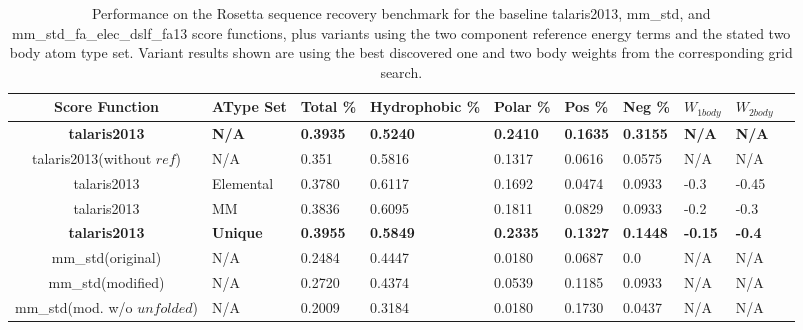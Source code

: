 \begin{table}[!htbp]

\fontsize{9pt}{9pt}
\selectfont

\begin{tabular}{c|lllllllll}
Score Function & AType Set & Total \% & Hydrophobic \% & Polar \% & Pos \% & Neg \% & $W_{1body}$ & $W_{2body}$\\
\hline
\textbf{talaris2013} & \textbf{N/A} & \textbf{0.3935} & \textbf{0.5240} & \textbf{0.2410} & \textbf{0.1635} & \textbf{0.3155} & \textbf{N/A} & \textbf{N/A}\\
talaris2013(without $ref$) & N/A & 0.351 & 0.5816 & 0.1317 & 0.0616 & 0.0575 & N/A & N/A\\
talaris2013 & Elemental & 0.3780 & 0.6117 & 0.1692 & 0.0474 & 0.0933 & -0.3 & -0.45\\
talaris2013 & MM & 0.3836 & 0.6095 & 0.1811 & 0.0829 & 0.0933 & -0.2 & -0.3\\
\textbf{talaris2013} & \textbf{Unique} & \textbf{0.3955} & \textbf{0.5849} & \textbf{0.2335} & \textbf{0.1327} & \textbf{0.1448} & \textbf{-0.15} & \textbf{-0.4}\\
\hline
mm\_std(original) & N/A & 0.2484 & 0.4447 & 0.0180 & 0.0687 & 0.0 & N/A & N/A\\
mm\_std(modified) & N/A & 0.2720 & 0.4374 & 0.0539 & 0.1185 & 0.0933 & N/A & N/A\\
mm\_std(mod. w/o $unfolded$) & N/A & 0.2009 & 0.3184 & 0.0180 & 0.1730 & 0.0437 & N/A & N/A\\

\end{tabular}

\fontsize{10pt}{11pt}
\selectfont
\caption{Performance on the Rosetta sequence recovery benchmark for the baseline talaris2013, mm\_std, and mm\_std\_fa\_elec\_dslf\_fa13 score functions, plus variants using the two component reference energy terms and the stated two body atom type set. 
Variant results shown are using the best discovered one and two body weights from the corresponding grid search.}
\label{tab:performance}

\end{table}
